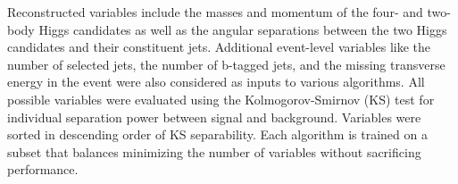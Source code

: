 Reconstructed variables include the masses and momentum of the four- and two-body Higgs candidates as well as the angular separations between the two Higgs candidates and their constituent jets. Additional event-level variables like the number of selected jets, the number of b-tagged jets, and the missing transverse energy in the event were also considered as inputs to various algorithms. All possible variables were evaluated using the Kolmogorov-Smirnov (KS) test for individual separation power between signal and background. Variables were sorted in descending order of KS separability. Each algorithm is trained on a subset that balances minimizing the number of variables without sacrificing performance. 
